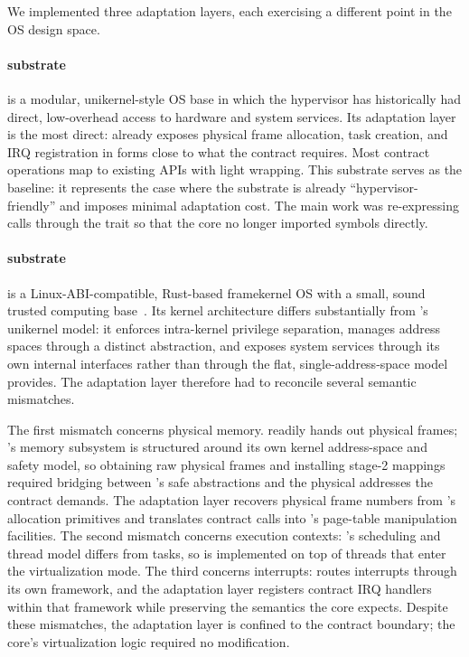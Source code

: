 We implemented three adaptation layers, each exercising a different point in the
OS design space.

\paragraph{\arceos{} substrate}
\arceos{} is a modular, unikernel-style OS base in which the hypervisor has
historically had direct, low-overhead access to hardware and system services.
Its adaptation layer is the most direct: \arceos{} already exposes physical
frame allocation, task creation, and IRQ registration in forms close to what the
contract requires. Most contract operations map to existing \arceos{} APIs with
light wrapping. This substrate serves as the baseline: it represents the case
where the substrate is already ``hypervisor-friendly'' and imposes minimal
adaptation cost. The main work was re-expressing \arceos{} calls through the
trait so that the core no longer imported \arceos{} symbols directly.

\paragraph{\asterinas{} substrate}
\asterinas{} is a Linux-ABI-compatible, Rust-based framekernel OS with a small,
sound trusted computing base~\cite{peng2025asterinas, peng2024framekernel}. Its
kernel architecture differs substantially from \arceos{}'s unikernel model: it
enforces intra-kernel privilege separation, manages address spaces through a
distinct abstraction, and exposes system services through its own internal
interfaces rather than through the flat, single-address-space model \arceos{}
provides. The \asterinas{} adaptation layer therefore had to reconcile several
semantic mismatches.

The first mismatch concerns physical memory. \arceos{} readily hands out
physical frames; \asterinas{}'s memory subsystem is structured around its own
kernel address-space and safety model, so obtaining raw physical frames and
installing stage-2 mappings required bridging between \asterinas{}'s safe
abstractions and the physical addresses the contract demands. The adaptation
layer recovers physical frame numbers from \asterinas{}'s allocation primitives
and translates contract  calls into \asterinas{}'s page-table
manipulation facilities. The second mismatch concerns execution contexts:
\asterinas{}'s scheduling and thread model differs from \arceos{} tasks, so
 is implemented on top of \asterinas{} threads that enter the
virtualization mode. The third concerns interrupts: \asterinas{} routes
interrupts through its own framework, and the adaptation layer registers
contract IRQ handlers within that framework while preserving the semantics the
core expects. Despite these mismatches, the adaptation layer is confined to the
contract boundary; the core's virtualization logic required no modification.

